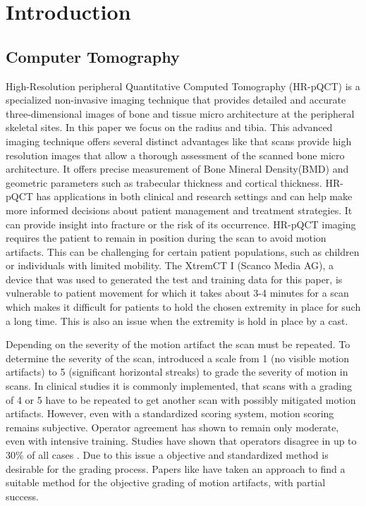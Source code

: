 \documentclass[
a4paper, 
12pt,
grayscalebody, %
abstract=on,
twoside, BCOR10mm, 12pt, DIV13,headinclude, footexclude, final, abstracton, openright
]{ibireprt}
\numberwithin{equation}{chapter}
\numberwithin{table}{chapter}
\numberwithin{figure}{chapter}
\numberwithin{algorithm}{chapter}
\numberwithin{example}{chapter}
\numberwithin{example}{chapter}
\begin{document}



\chapter{Introduction}
\section{Computer Tomography}
High-Resolution peripheral Quantitative Computed Tomography (HR-pQCT) is a specialized non-invasive imaging technique that provides detailed and accurate three-dimensional images of bone and tissue micro architecture at the peripheral skeletal sites. In this paper we focus  on the radius and tibia. This advanced imaging technique offers several distinct advantages like that scans provide high resolution images that allow a thorough assessment of the scanned bone micro architecture. It offers precise measurement of Bone Mineral Density(BMD) and geometric parameters such as trabecular thickness and cortical thickness. HR-pQCT has applications in both clinical and research settings and can help make more informed decisions about patient management and treatment strategies. It can provide insight into fracture or the risk of its occurrence. HR-pQCT imaging requires the patient to remain in position during the scan to avoid motion artifacts. This can be challenging for certain patient populations, such as children or individuals with limited  mobility. The XtremCT I (Scanco Media AG), a device that  was used to generated the test and training data for this paper, is vulnerable to patient movement for which it takes about 3-4 minutes for a scan which makes it difficult for patients to hold the chosen extremity in place for such a long time. This is also an issue when the extremity is hold in place by a cast.

 Depending on the severity of the motion artifact the scan must be repeated. To determine the severity of the scan, \cite{Whittier2020} introduced a scale from 1 (no visible motion artifacts) to 5 (significant horizontal streaks) to grade the severity of motion in scans. In clinical studies it is commonly implemented, that scans with a grading of 4 or 5 have to be repeated to get another scan with possibly mitigated motion artifacts. However, even with a standardized scoring system, motion scoring remains subjective. Operator agreement has shown to remain only moderate, even with intensive training. Studies have shown that operators disagree in up to 30\% of all cases \cite{Walle2023}. Due to this issue a objective and standardized method is desirable for the grading process. Papers like \cite{Walle2023} have taken an approach to find a suitable method for the objective grading of motion artifacts, with partial success.
 
\end{document}
